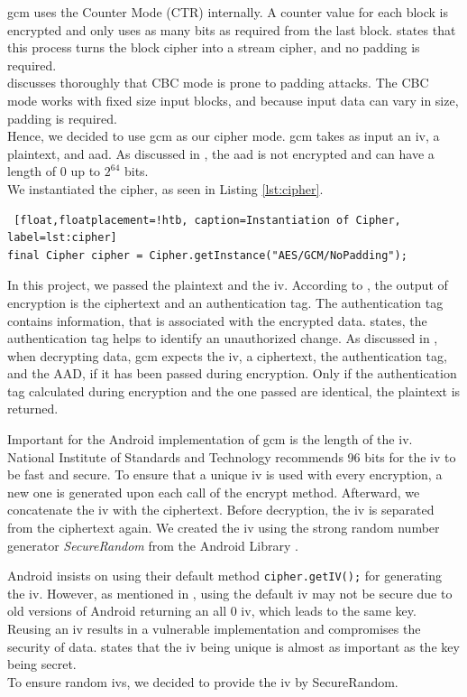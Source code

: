 \gls{gcm} uses the Counter Mode (CTR) internally. A counter value for each block is encrypted and only uses as many bits as required from the last block. \cite{AESJavaAndroid} states that this process turns the block cipher into a stream cipher, and no padding is required. \\
\cite{fedler2013padding} discusses thoroughly that CBC mode is prone to padding attacks. The CBC mode works with fixed size input blocks, and because input data can vary in size, padding is required. \\
Hence, we decided to use \gls{gcm} as our cipher mode. \gls{gcm} takes as input an \gls{iv}, a plaintext, and \gls{aad}. As discussed in \cite{mcgrew2004galois}, the \gls{aad} is not encrypted and can have a length of $0$ up to $2^{64}$ bits. \\
We instantiated the cipher, as seen in Listing \ref{lst:cipher}.

\begin{lstlisting} [float,floatplacement=!htb, caption=Instantiation of Cipher, label=lst:cipher]
final Cipher cipher = Cipher.getInstance("AES/GCM/NoPadding");
\end{lstlisting}

In this project, we passed the plaintext and the \gls{iv}. According to \cite{dworkin2007sp}, the output of encryption is the ciphertext and an authentication tag. The authentication tag contains information, that is associated with the encrypted data. \cite{AESJavaAndroid} states, the authentication tag helps to identify an unauthorized change. As discussed in \cite{dworkin2007sp}, when decrypting data, \gls{gcm} expects the \gls{iv}, a ciphertext, the authentication tag, and the AAD, if it has been passed during encryption. Only if the authentication tag calculated during encryption and the one passed are identical, the plaintext is returned.

Important for the Android implementation of \gls{gcm} is the length of the \gls{iv}. National Institute of Standards and Technology \cite{dworkin2007sp} recommends 96 bits for the \gls{iv} to be fast and secure. To ensure that a unique \gls{iv} is used with every encryption, a new one is generated upon each call of the encrypt method. Afterward, we concatenate the \gls{iv} with the ciphertext. Before decryption, the \gls{iv} is separated from the ciphertext again. We created the \gls{iv} using the strong random number generator \textit{SecureRandom} from the Android Library \cite{SecureRandom}.

Android insists on using their default method \texttt{cipher.getIV();} for generating the \gls{iv}. However, as mentioned in \cite{DefaultIV}, using the default \gls{iv} may not be secure due to old versions of Android returning an all $0$ \gls{iv}, which leads to the same key. Reusing an \gls{iv} results in a vulnerable implementation and compromises the security of data. \cite{dworkin2007sp} states that the \gls{iv} being unique is almost as important as the key being secret. \\
To ensure random \glspl{iv}, we decided to provide the \gls{iv} by SecureRandom. 

